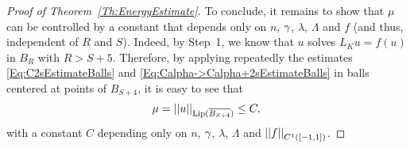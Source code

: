 \begin{proof}[Proof of Theorem~\ref{Th:EnergyEstimate}]
To conclude, it remains to show that $\mu$ can be controlled by a constant that depends only on $n$, $\gamma$, $\lambda$, $\Lambda$ and $f$ (and thus, independent of $R$ and $S$). Indeed, by Step~1, we know that $u$ solves $L_K u = f(u)$ in $B_R$ with $R> S+5$. Therefore, by applying repeatedly the estimates \eqref{Eq:C2sEstimateBalls} and \eqref{Eq:Calpha->Calpha+2sEstimateBalls} in balls centered at points of $B_{S+4}$, it is easy to see that
$$
\mu = \left | \left |{u} \right | \right |_{\mathrm{Lip}(\overline{B_{S+4}})} \leq C,
$$ 
with a constant $C$ depending only on $n$, $\gamma$, $\lambda$, $\Lambda$ and $\left | \left |{f} \right | \right |_{C^1([-1,1])}$.
\end{proof}
